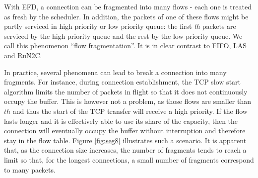 \documentclass[preprint,12pt]{elsarticle}
\begin{document}
With EFD, a connection can be fragmented into many flows - each one is treated as fresh by the scheduler. In addition, the packets of one of these flows might be partly serviced in high priority or low priority queue: the first \textit{th} packets are serviced by the high priority queue and the rest by the low priority queue. We call this phenomenon ``flow fragmentation''. It is in clear contrast to FIFO, LAS and RuN2C.

In practice, several phenomena can lead to break a connection into many fragments. For instance,  during connection establishment, the TCP slow start algorithm limits the number of packets in flight so that it does not continuously occupy the buffer. This is however not a problem, as those flows are smaller than $th$ and thus the start of the TCP transfer will receive a high priority. If the flow lasts longer and it is effectively able to use its share of the capacity, then the connection will eventually occupy  the buffer without interruption and therefore stay in the flow table. Figure \ref{fig:seg8} illustrates such a scenario. It is apparent that, as the connection size increases, the number of fragments tends to reach a limit so that, for the longest connections, a small number of fragments correspond to many packets.


\end{document}
